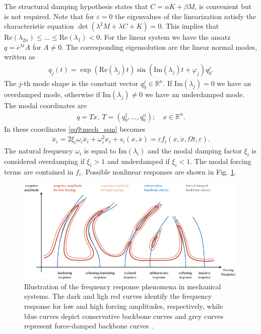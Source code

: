 The structural damping hypothesis states that $C = \alpha K + \beta M$, is convenient but is not required. Note that for $\varepsilon=0$ the eigenvalues of the linearization satisfy the characteristic equation $\det(\lambda^2 M + \lambda C + K) = 0$. This implies that $ \textrm{Re}(\lambda _{2n})\leq \ldots \leq  \textrm{Re} (\lambda _1) < 0$. For the linear system we have the ansatz $q = e^{\lambda t}A$ for $A\neq 0$. The corresponding eigensolution are the linear normal modes, written as
\begin{align}
	q_{j}(t) = \exp( \textrm{Re} (\lambda_j)t) \sin( \textrm{Im} (\lambda_j)t + \varphi_j) q_{0}^{j}.
\end{align}
The $j$-th mode shape is the constant vector $q_{0}^{j}\in \mathbb{R}^{n}$. If $ \textrm{Im} (\lambda_j) = 0$ we have an overdamped mode, otherwise if $ \textrm{Im} (\lambda _j)\neq 0$ we have an underdamped mode. The modal coordinates are 
\begin{align}
	q=Tx,\ T = ( q_{0}^{1},\ldots, q_{0}^{n})	;\quad x \in \mathbb{R}^{n}.
\end{align}
In these coordinates \eqref{eq9:mech_ssm} becomes
\begin{align}
	\ddot{x}_{i} = 2 \xi_i\omega_i \dot{x}_{i} + \omega_{i}^{2}x_i + s_i(x, \dot{x}) = \varepsilon f_i(x, \dot{x}, \Omega t, \varepsilon).
\end{align}
The natural frequency $\omega_i$ is equal to $ \textrm{Im} (\lambda_i)$ and the modal damping factor $\xi_i$ is considered overdamping if $\xi_i >1$ and underdamped if $\xi_i<1$. The modal forcing terms are contained in $f_i$. Possible nonlinear responses are shown in Fig. \ref{fig:frf}.
\begin{figure}[h!]
	\centering
	\includegraphics[width=0.99\textwidth]{figures/ch9/frf.pdf}
	\caption{Illustration of the frequency response phenomena in mechanical systems. The dark and ligh red curves identify the frequency response for low and high forcing amplitudes, respectively, while blue curves depict conservative backbone curves and grey curves represent force-damped backbone curves \cite{Cenedese_2020}.}
	\label{fig:frf}
\end{figure}

